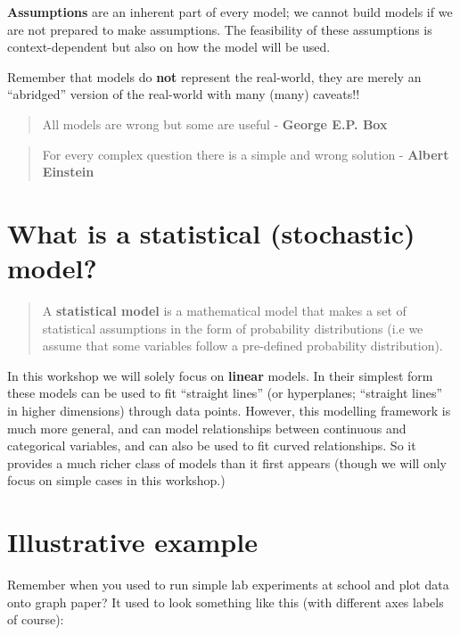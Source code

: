 \documentclass[]{book}
\theoremstyle{definition}
\theoremstyle{definition}
\theoremstyle{definition}
\theoremstyle{remark}
\begin{document}
\textbf{Assumptions} are an inherent part of every model; we cannot
build models if we are not prepared to make assumptions. The feasibility
of these assumptions is context-dependent but also on how the model will
be used.

Remember that models do \textbf{not} represent the real-world, they are
merely an ``abridged'' version of the real-world with many (many)
caveats!!

\begin{quote}
All models are wrong but some are useful - \textbf{George E.P. Box}
\end{quote}

\begin{quote}
For every complex question there is a simple and wrong solution -
\textbf{Albert Einstein}
\end{quote}

\section{What is a statistical (stochastic)
model?}\label{what-is-a-statistical-stochastic-model}

\begin{quote}
A \textbf{statistical model} is a mathematical model that makes a set of
statistical assumptions in the form of probability distributions (i.e we
assume that some variables follow a pre-defined probability
distribution).
\end{quote}

In this workshop we will solely focus on \textbf{linear} models. In
their simplest form these models can be used to fit ``straight lines''
(or hyperplanes; ``straight lines'' in higher dimensions) through data
points. However, this modelling framework is much more general, and can
model relationships between continuous and categorical variables, and
can also be used to fit curved relationships. So it provides a much
richer class of models than it first appears (though we will only focus
on simple cases in this workshop.)

\section{Illustrative example}\label{illustrative-example}

Remember when you used to run simple lab experiments at school and plot
data onto graph paper? It used to look something like this (with
different axes labels of course):
\end{document}
